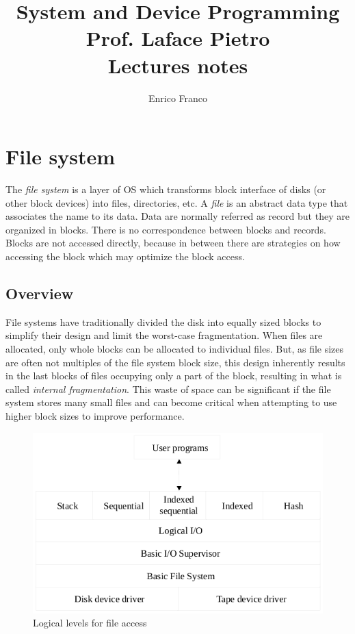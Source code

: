 \documentclass{report}
\author{Enrico Franco}
\title{System and Device Programming \\
	Prof. Laface Pietro \\
	Lectures notes}
\begin{document}
\maketitle
\tableofcontents








\chapter{File system}
The \emph{file system} is a layer of OS which transforms block interface of disks (or other block devices) into files, directories, etc.
A \emph{file} is an abstract data type that associates the name to its data. Data are normally referred as record but they are organized in blocks. There is no correspondence between blocks and records. Blocks are not accessed directly, because in between there are strategies on how accessing the block which may optimize the block access.

\section{Overview}
File systems have traditionally divided the disk into equally sized blocks to simplify their design and limit the worst-case fragmentation. When files are allocated, only whole blocks can be allocated to individual files. But, as file sizes are often not multiples of the file system block size, this design inherently results in the last blocks of files  occupying only a part of the block, resulting in what is called \emph{internal fragmentation}. This waste of space can be significant if the file system stores many small files and can become critical when attempting to use higher block sizes to improve performance.

\begin{figure}[hbtp]
\centering
\includegraphics[scale=0.4]{images/file_system/logical_level_file_access.png}
\caption{Logical levels for file access}
\end{figure}
\end{document}
